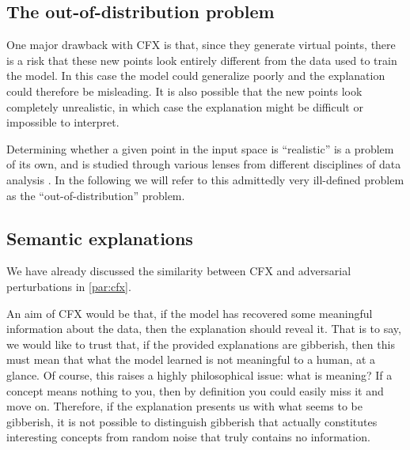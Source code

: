 \documentclass[../main.tex]{subfiles}
\begin{document}
\subsection{The out-of-distribution problem}

One major drawback with CFX is that, since they generate virtual points, there is a risk that these new points look entirely different from the data used to train the model.
In this case the model could generalize poorly and the explanation could therefore be misleading.
It is also possible that the new points look completely unrealistic, in which case the explanation might be difficult or impossible to interpret.


Determining whether a given point in the input space is ``realistic'' is a problem of its own, and is studied through various lenses from different disciplines of data analysis \cite{yangGeneralized2022}.
In the following we will refer to this admittedly very ill-defined problem as the ``out-of-distribution'' problem.

\subsection{Semantic explanations}

We have already discussed the similarity between CFX and adversarial perturbations in \autoref{par:cfx}. 


An aim of CFX would be that, if the model has recovered some meaningful information about the data, then the explanation should reveal it. That is to say, we would like to trust that, if the provided explanations are gibberish, then this must mean that what the model learned is not meaningful to a human, at a glance.
Of course, this raises a highly philosophical issue: what is meaning? 
If a concept means nothing to you, then by definition you could easily miss it and move on.
Therefore, if the explanation presents us with what seems to be gibberish, it is not possible to distinguish gibberish that actually constitutes interesting concepts from random noise that truly contains no information.
\end{document}
